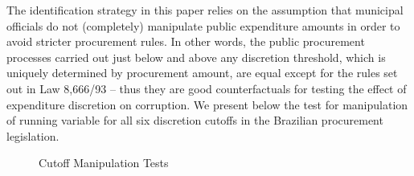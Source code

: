 \documentclass[11pt]{article}
\begin{document}
The identification strategy in this paper relies on the assumption that municipal officials do not (completely) manipulate public expenditure amounts in order to avoid stricter procurement rules. In other words, the public procurement processes carried out just below and above any discretion threshold, which is uniquely determined by procurement amount, are equal except for the rules set out in Law 8,666/93 -- thus they are good counterfactuals for testing the effect of expenditure discretion on corruption. We present below the \citet{McCraryManipulationrunningvariable2008} test for manipulation of running variable for all six discretion cutoffs in the Brazilian procurement legislation.

\begin{figure}[!htbp]
  \caption{\label{fig:manipulationtests} Cutoff Manipulation Tests}

  \centering


\end{figure}
\end{document}
